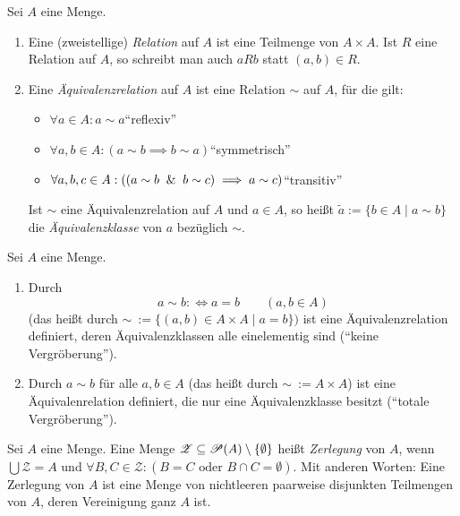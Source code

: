 \documentclass[../../main.tex]{subfiles}
\begin{document}
\begin{df}\label{1.3.1}
Sei $A$ eine Menge.
\begin{enumerate}[\normalfont(a)]
\item Eine (zweistellige) \emph{Relation} auf $A$ ist eine Teilmenge von $A\times A$. Ist $R$
eine Relation auf $A$, so schreibt man auch $aRb$ statt $(a,b)\in R$.
\item Eine \emph{Äquivalenzrelation} auf $A$ ist eine Relation $\sim$ auf $A$, für die gilt:
\begin{itemize}
\item $\forall a\in A:a\sim a$\qquad"`reflexiv"'
\item $\forall a,b\in A:(a\sim b\implies b\sim a)$\qquad"`symmetrisch"'
\item $\forall a,b,c\in A:((a\sim b ~\mathbin{\&}~ b\sim c)\implies a\sim c)$\qquad"`transitiv"'
\end{itemize}
Ist $\sim$ eine Äquivalenzrelation auf $A$ und $a\in A$,
so heißt $\widetilde{a}:=\{b\in A\mid a\sim b\}$ die \emph{Äquivalenzklasse} von $a$ bezüglich $\sim$. \label{eqc}
\end{enumerate}
\end{df}

\begin{bsp}\label{1.3.2}
Sei $A$ eine Menge.
\begin{enumerate}[\normalfont(a)]
\item Durch
$$a\sim b:\iff a=b\qquad(a,b\in A)$$
(das heißt durch $\sim~:=\{(a,b)\in A\times A\mid a=b\})$ ist eine Äquivalenzrelation definiert, deren Äquivalenzklassen alle
einelementig sind ("`keine Vergröberung"').
\item Durch $a\sim b$ für alle $a,b\in A$ (das heißt durch $\sim~:=A\times A$) ist eine Äquivalenrelation definiert, die nur eine Äquivalenzklasse besitzt ("`totale Vergröberung"').
\end{enumerate}
\end{bsp}

\begin{df}\label{1.3.3}
Sei $A$ eine Menge. Eine Menge $\mathcal Z\subseteq\mathcal P(A)\setminus\{\emptyset\}$ heißt \emph{Zerlegung}
von $A$, wenn $\bigcup\mathcal Z=A$ und $\forall B,C\in \mathcal Z:(B=C\text{ oder }B\cap C=\emptyset)$. Mit anderen
Worten: Eine Zerlegung von $A$ ist eine Menge von nichtleeren paarweise disjunkten Teilmengen von $A$, deren Vereinigung ganz $A$ ist.
\end{df}
\end{document}
